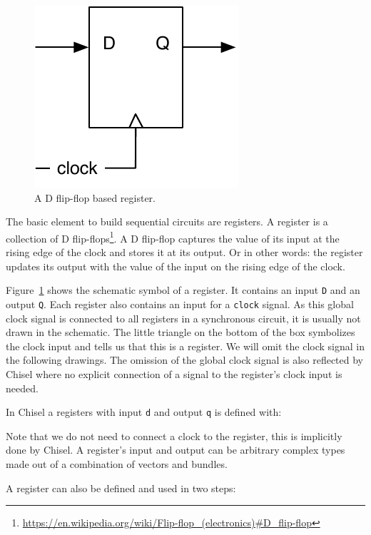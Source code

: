 \documentclass[%
    10pt,
    headinclude, footexclude,
    openright, %
    notitlepage,
    cleardoubleempty,
    headsepline,
    pointlessnumbers,
    bibtotoc, idxtotoc,
    ]{scrbook}
\newcommand{\code}[1]{{\small{\texttt{#1}}}}
\newcommand{\scale}{0.7}
\newcommand{\myref}[2]{\href{#1}{#2}}
\renewcommand{\myref}[2]{{#2}{\footnote{\url{#1}}}}
\begin{document}
\begin{figure}
  \centering
  \includegraphics[scale=\scale]{figures/register}
  \caption{A D flip-flop based register.}
  \label{fig:register}
\end{figure}

The basic element to build sequential circuits are registers. A register is a collection
of \myref{https://en.wikipedia.org/wiki/Flip-flop_(electronics)\#D_flip-flop}{D flip-flops}.
A D flip-flop captures the value of its input at the rising edge of the clock and stores
it at its output. Or in other words: the register updates its output with the value of the input on the
rising edge of the clock.

Figure~\ref{fig:register} shows the schematic symbol of a register. It contains an input
\code{D} and an output \code{Q}. Each register also contains an input for a \code{clock} signal.
As this global clock signal is connected to all registers in a synchronous circuit, it is usually
not drawn in the schematic. The little triangle on the bottom of the box symbolizes the
clock input and tells us that this is a register. We will omit the clock signal in the following
drawings.
The omission of the global clock signal is also reflected by Chisel where no explicit
connection of a signal to the register's clock input is needed.

In Chisel a registers with input \code{d} and output \code{q} is defined with:


\noindent Note that we do not need to connect a clock to the register, this is
implicitly done by Chisel. A register's input and output can be arbitrary complex types
made out of a combination of vectors and bundles.

A register can also be defined and used in two steps:

\end{document}

